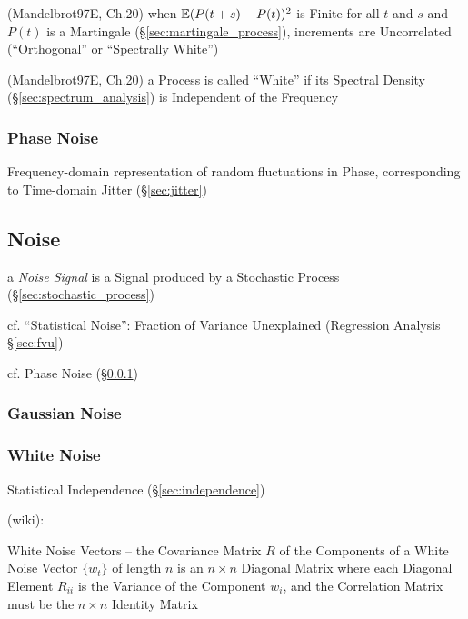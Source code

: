 (Mandelbrot97E, Ch.20) when $\mathbb{E}(P(t+s) - P(t))^2$ is Finite for all $t$ and
$s$ and $P(t)$ is a Martingale (\S\ref{sec:martingale_process}), increments are
Uncorrelated (``Orthogonal'' or ``Spectrally White'')

(Mandelbrot97E, Ch.20) a Process is called ``White'' if its Spectral Density
(\S\ref{sec:spectrum_analysis}) is Independent of the Frequency



\subsubsection{Phase Noise}\label{sec:phase_noise}

Frequency-domain representation of random fluctuations in Phase, corresponding
to Time-domain Jitter (\S\ref{sec:jitter})



\subsection{Noise}\label{sec:noise}

a \emph{Noise Signal} is a Signal produced by a Stochastic Process
(\S\ref{sec:stochastic_process})

cf. ``Statistical Noise'': Fraction of Variance Unexplained (Regression Analysis
\S\ref{sec:fvu})

cf. Phase Noise (\S\ref{sec:phase_noise})



\subsubsection{Gaussian Noise}\label{sec:gaussian_noise}

\subsubsection{White Noise}\label{sec:white_noise}

Statistical Independence (\S\ref{sec:independence})

(wiki):

White Noise Vectors -- the Covariance Matrix $R$ of the Components of a White
Noise Vector $\{ w_t \}$ of length $n$ is an $n \times n$ Diagonal Matrix where
each Diagonal Element $R_{ii}$ is the Variance of the Component $w_i$, and the
Correlation Matrix must be the $n \times n $ Identity Matrix

